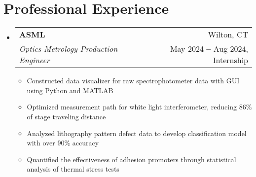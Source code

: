 \documentclass[a4paper,11pt]{article}
\makeatletter
\newcommand{\resumeItem}[1]{
  \item\small{
    {#1 \vspace{-2pt}}
  }
}
\newcommand{\resumeDoubleHeading}[4]{
  \vspace{-2pt}\item
    \begin{tabular*}{0.97\textwidth}[t]{l@{\extracolsep{\fill}}r}
        \textbf{#1} & #2 \\
        \textit{\small#3} & {\small #4} \\
    \end{tabular*}\vspace{-5pt}
}
\newcommand{\resumeSubHeadingListStart}{\begin{itemize}[leftmargin=0.15in, label={}]}
\newcommand{\resumeSubHeadingListEnd}{\end{itemize}}
\newcommand{\resumeItemListStart}{\begin{itemize}}
\newcommand{\resumeItemListEnd}{\end{itemize}\vspace{-5pt}}
\makeatother
\begin{document}

\section{Professional Experience}
  \resumeSubHeadingListStart
    \resumeDoubleHeading
      {ASML}{Wilton, CT}
      {Optics Metrology Production Engineer}{May 2024 \textbf{--} Aug 2024, Internship}
        \resumeItemListStart
            \resumeItem{Constructed data visualizer for raw spectrophotometer data with GUI using Python and MATLAB}
            \resumeItem{Optimized measurement path for white light interferometer, reducing 86\% of stage traveling distance}
            \resumeItem{Analyzed lithography pattern defect data to develop classification model with over 90\% accuracy}
            \resumeItem{Quantified the effectiveness of adhesion promoters through statistical analysis of thermal stress tests}
        \resumeItemListEnd
  \resumeSubHeadingListEnd
\end{document}

